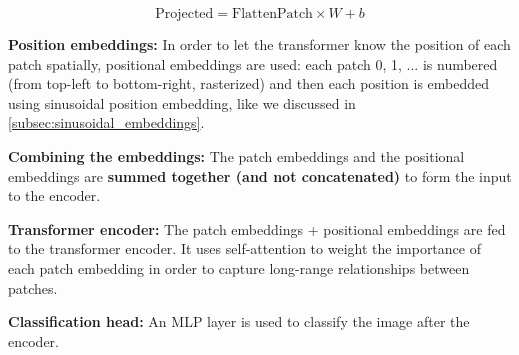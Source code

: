 \[ \text{Projected} = \text{FlattenPatch} \times W + b \]

\textbf{Position embeddings:} In order to let the transformer know the position of each patch spatially, positional embeddings are used: each patch 0, 1, ... is numbered (from top-left to bottom-right, rasterized) and then each position is embedded using sinusoidal position embedding, like we discussed in \ref{subsec:sinusoidal_embeddings}.

\textbf{Combining the embeddings:} The patch embeddings and the positional embeddings are \textbf{summed together (and not concatenated)} to form the input to the encoder.

\textbf{Transformer encoder:} The patch embeddings + positional embeddings are fed to the transformer encoder. It uses self-attention to weight the importance of each patch embedding in order to capture long-range relationships between patches.

\textbf{Classification head:} An MLP layer is used to classify the image after the encoder.

